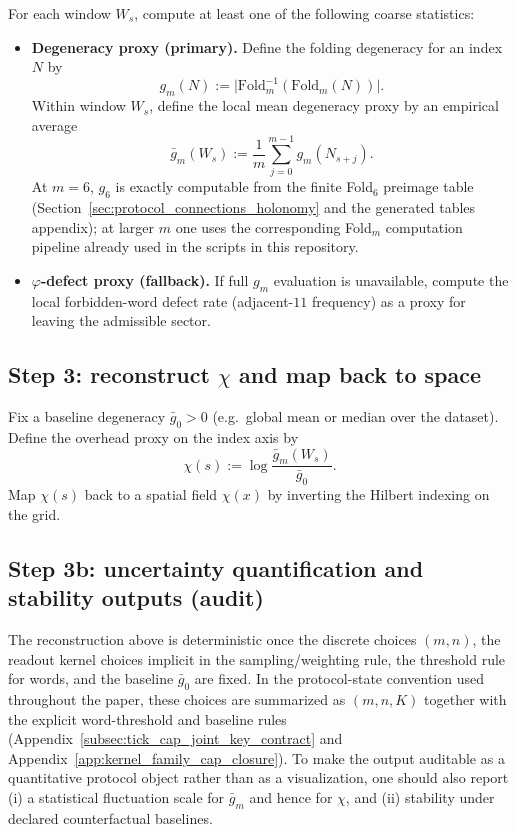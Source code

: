 For each window $W_s$, compute at least one of the following coarse statistics:
\begin{itemize}
\item \textbf{Degeneracy proxy (primary).}
Define the folding degeneracy for an index $N$ by
\[
g_m(N):=\bigl|\mathrm{Fold}_m^{-1}(\mathrm{Fold}_m(N))\bigr|.
\]
Within window $W_s$, define the local mean degeneracy proxy by an empirical average
\[
\bar g_m(W_s):=\frac{1}{m}\sum_{j=0}^{m-1} g_m(N_{s+j}).
\]
At $m=6$, $g_6$ is exactly computable from the finite Fold$_6$ preimage table (Section~\ref{sec:protocol_connections_holonomy} and the generated tables appendix); at larger $m$ one uses the corresponding Fold$_m$ computation pipeline already used in the scripts in this repository.
\item \textbf{$\varphi$-defect proxy (fallback).}
If full $g_m$ evaluation is unavailable, compute the local forbidden-word defect rate (adjacent-$11$ frequency) as a proxy for leaving the admissible sector.
\end{itemize}

\subsection{Step 3: reconstruct \texorpdfstring{$\chi$}{chi} and map back to space}
\label{subsec:chi_step3_reconstruct}

Fix a baseline degeneracy $\bar g_0>0$ (e.g.\ global mean or median over the dataset).
Define the overhead proxy on the index axis by
\begin{equation}
\label{eq:chi_reconstruct_def}
\chi(s):=\log\frac{\bar g_m(W_s)}{\bar g_0}.
\end{equation}
Map $\chi(s)$ back to a spatial field $\chi(x)$ by inverting the Hilbert indexing on the grid.

\subsection{Step 3b: uncertainty quantification and stability outputs (audit)}
\label{subsec:chi_step3b_uncertainty}

The reconstruction above is deterministic once the discrete choices $(m,n)$, the readout kernel choices implicit in the sampling/weighting rule, the threshold rule for words, and the baseline $\bar g_0$ are fixed.
In the protocol-state convention used throughout the paper, these choices are summarized as $(m,n,K)$ together with the explicit word-threshold and baseline rules (Appendix~\ref{subsec:tick_cap_joint_key_contract} and Appendix~\ref{app:kernel_family_cap_closure}).
To make the output auditable as a quantitative protocol object rather than as a visualization, one should also report (i) a statistical fluctuation scale for $\bar g_m$ and hence for $\chi$, and (ii) stability under declared counterfactual baselines.

